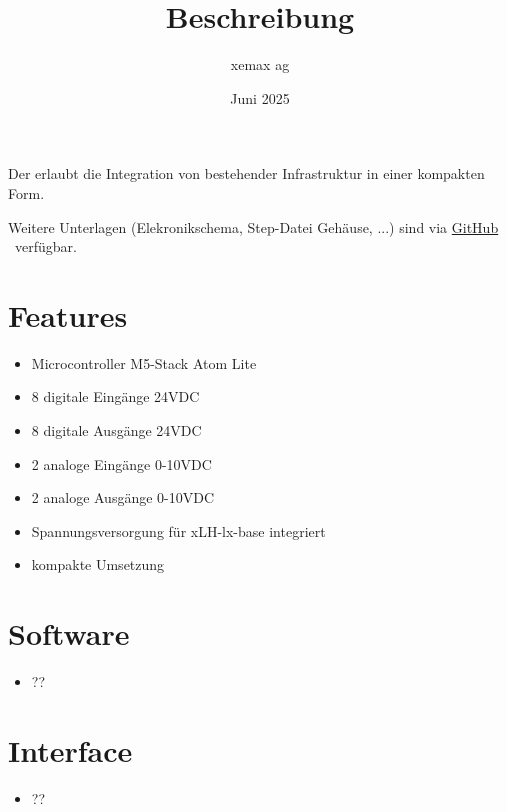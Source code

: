 \documentclass[10pt]{datasheet}
\title{Beschreibung \xlhPlattformID}
\author{xemax ag}
\date{Juni 2025}
\begin{document}
\maketitle



Der \xlhPlattformID erlaubt die Integration von bestehender Infrastruktur in einer kompakten Form.

Weitere Unterlagen (Elekronikschema, Step-Datei Gehäuse, ...) sind via
\href{https://github.com/xemax-ag/xLH/}{GitHub \xlhPlattformID}\ verfügbar.

\section{Features}

\begin{itemize}
    \item Microcontroller M5-Stack Atom Lite
    \item 8 digitale Eingänge 24VDC
    \item 8 digitale Ausgänge 24VDC
    \item 2 analoge Eingänge 0-10VDC
    \item 2 analoge Ausgänge 0-10VDC
    \item Spannungsversorgung für xLH-lx-base integriert
    \item kompakte Umsetzung
\end{itemize}

\section{Software}

\begin{itemize}
    \item ??
\end{itemize}

\section{Interface}

\begin{itemize}
    \item ??
\end{itemize}

\vfill\break
\end{document}
